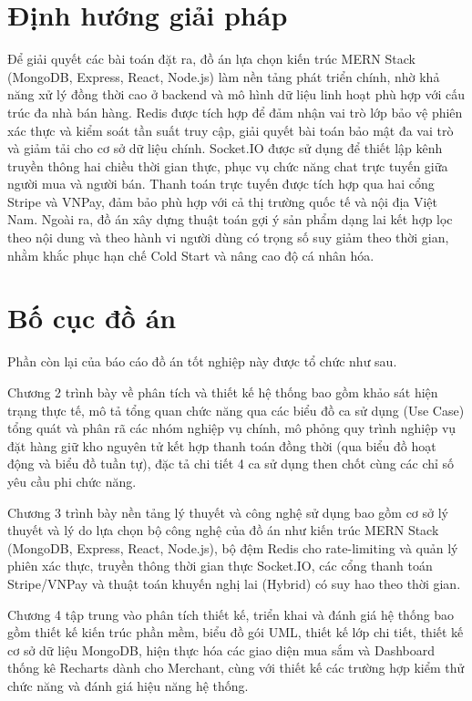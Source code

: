 \documentclass[../DoAn.tex]{subfiles}
\begin{document}
\section{Định hướng giải pháp}
\label{section:1.3}
Để giải quyết các bài toán đặt ra, đồ án lựa chọn kiến trúc MERN Stack (MongoDB, Express, React, Node.js) làm nền tảng phát triển chính, nhờ khả năng xử lý đồng thời cao ở backend và mô hình dữ liệu linh hoạt phù hợp với cấu trúc đa nhà bán hàng. Redis được tích hợp để đảm nhận vai trò lớp bảo vệ phiên xác thực và kiểm soát tần suất truy cập, giải quyết bài toán bảo mật đa vai trò và giảm tải cho cơ sở dữ liệu chính. Socket.IO được sử dụng để thiết lập kênh truyền thông hai chiều thời gian thực, phục vụ chức năng chat trực tuyến giữa người mua và người bán. Thanh toán trực tuyến được tích hợp qua hai cổng Stripe và VNPay, đảm bảo phù hợp với cả thị trường quốc tế và nội địa Việt Nam. Ngoài ra, đồ án xây dựng thuật toán gợi ý sản phẩm dạng lai kết hợp lọc theo nội dung và theo hành vi người dùng có trọng số suy giảm theo thời gian, nhằm khắc phục hạn chế Cold Start và nâng cao độ cá nhân hóa.

\section{Bố cục đồ án}
\label{section:1.4}
Phần còn lại của báo cáo đồ án tốt nghiệp này được tổ chức như sau.

Chương 2 trình bày về phân tích và thiết kế hệ thống bao gồm khảo sát hiện trạng thực tế, mô tả tổng quan chức năng qua các biểu đồ ca sử dụng (Use Case) tổng quát và phân rã các nhóm nghiệp vụ chính, mô phỏng quy trình nghiệp vụ đặt hàng giữ kho nguyên tử kết hợp thanh toán đồng thời (qua biểu đồ hoạt động và biểu đồ tuần tự), đặc tả chi tiết 4 ca sử dụng then chốt cùng các chỉ số yêu cầu phi chức năng.

Chương 3 trình bày nền tảng lý thuyết và công nghệ sử dụng bao gồm cơ sở lý thuyết và lý do lựa chọn bộ công nghệ của đồ án như kiến trúc MERN Stack (MongoDB, Express, React, Node.js), bộ đệm Redis cho rate-limiting và quản lý phiên xác thực, truyền thông thời gian thực Socket.IO, các cổng thanh toán Stripe/VNPay và thuật toán khuyến nghị lai (Hybrid) có suy hao theo thời gian.

Chương 4 tập trung vào phân tích thiết kế, triển khai và đánh giá hệ thống bao gồm thiết kế kiến trúc phần mềm, biểu đồ gói UML, thiết kế lớp chi tiết, thiết kế cơ sở dữ liệu MongoDB, hiện thực hóa các giao diện mua sắm và Dashboard thống kê Recharts dành cho Merchant, cùng với thiết kế các trường hợp kiểm thử chức năng và đánh giá hiệu năng hệ thống.
\end{document}
